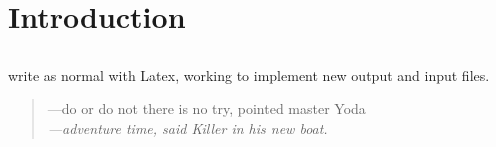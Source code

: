 \chapter{Introduction} 
\section{} 
write as normal with Latex, working to implement new output and input files.
\begin{quote}
---do or do not there is no try, pointed master Yoda\\
\textit{---adventure time, said Killer in his new boat.}
\end{quote}